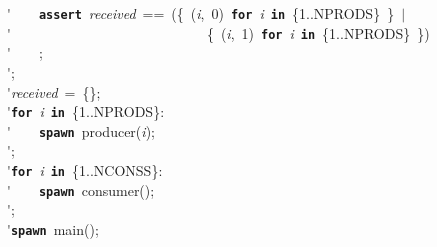 \'\>~~~~\texttt{\textbf{assert}}~\textit{received}~==~(\{~(\textit{i},~0)~\texttt{\textbf{for}}~\textit{i}~\texttt{\textbf{in}}~\{1..NPRODS\}~\}~$\vert$\\

\'\>~~~~~~~~~~~~~~~~~~~~~~~~~~~~\{~(\textit{i},~1)~\texttt{\textbf{for}}~\textit{i}~\texttt{\textbf{in}}~\{1..NPRODS\}~\})\\

\'\>~~~~;\\

\'\>;\\

\'\>\textit{received}~=~\{\};\\

\'\>\texttt{\textbf{for}}~\textit{i}~\texttt{\textbf{in}}~\{1..NPRODS\}:\\

\'\>~~~~\texttt{\textbf{spawn}}~producer(\textit{i});\\

\'\>;\\

\'\>\texttt{\textbf{for}}~\textit{i}~\texttt{\textbf{in}}~\{1..NCONSS\}:\\

\'\>~~~~\texttt{\textbf{spawn}}~consumer();\\

\'\>;\\

\'\>\texttt{\textbf{spawn}}~main();
